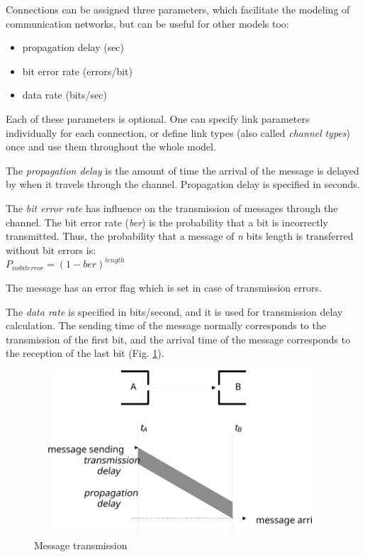 
Connections can be assigned three parameters, which facilitate
the modeling of communication networks, but can be useful for
other models too:
\begin{itemize}
  \item{propagation delay (sec)}
  \item{bit error rate (errors/bit)}
  \item{data rate (bits/sec)}
\end{itemize}


Each of these parameters is optional. One can specify link parameters
individually for each connection, or define link types (also
called \textit{channel} \textit{types}) once and use them throughout the
whole model.

The \textit{propagation delay} is the amount of time the arrival of
the message is delayed by when it travels through the channel.
Propagation delay is specified in seconds.

The \textit{bit error rate} has influence on the transmission of messages
through the channel. The bit error rate (\textit{ber}) is the probability that
a bit is incorrectly transmitted. Thus, the probability that
a message of \textit{n} bits length is transferred without bit errors is:\\

$P_{no bit error} = (1 - {ber})^{length}$

The message has an error flag which is set in case of transmission
errors.

The \textit{data rate} is specified in bits/second, and it is used
for transmission delay calculation. The sending time of the message
normally corresponds to the transmission of the first bit, and
the arrival time of the message corresponds to the reception
of the last bit (Fig. \ref{fig:ch-overview:message-transm}).

\begin{figure}[htbp]
\begin{center}
\includegraphics[width=4.301in, height=2.417in]{figures/simple-transmission}
\caption{Message transmission}
\label{fig:ch-overview:message-transm}
\end{center}
\end{figure}

